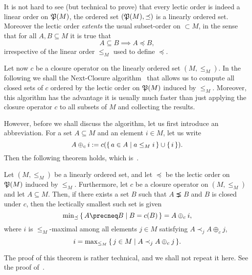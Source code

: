 It is not hard to see (but technical to prove) that every lectic order is indeed a linear
order on ${\mathfrak{P}(M)}$, \ie the ordered set $({\mathfrak{P}(M)}, \preceq)$ is a linearly ordered
set.  Moreover the lectic order \emph{extents} the usual subset-order on $\subset{M}$, in
the sense that for all $A, B \subseteq M$ it is true that
\begin{equation*}
  A \subseteq B \implies A \preceq B,
\end{equation*}
irrespective of the linear order $\leq_M$ used to define $\preceq$.

Let now $c$ be a closure operator on the linearly ordered set $(M, \leq_M)$.  In the
following we shall the Next-Closure algorithm~\cite{fca-book,DBLP:conf/icfca/Ganter10}
that allows us to compute all closed sets of $c$ ordered by the lectic order on
${\mathfrak{P}(M)}$ induced by $\leq_M$.  Moreover, this algorithm has the advantage it is
usually much faster than just applying the closure operator $c$ to all subsets of $M$ and
collecting the results.

However, before we shall discuss the algorithm, let us first introduce an abbreviation.
For a set $A \subseteq M$ and an element $i \in M$, let us write
\begin{equation*}
  A \oplus_c i := c({\{\, a \in A \mid a \leq_M i \,\}} \cup {\ensuremath{\{\,i\,\}}}).
\end{equation*}
Then the following theorem holds, which is~\cite[Theorem 5]{fca-book}.

\begin{Theorem}
  \label{thm:next-closure}
  Let $(M, \leq_M)$ be a linearly ordered set, and let $\preceq$ be the lectic order on
  ${\mathfrak{P}(M)}$ induced by $\leq_M$.  Furthermore, let $c$ be a closure operator on $(M,
  \leq_M)$ and let $A \subseteq M$.  Then, if there exists a set $B$ such that $A \precneq
  B$ and $B$ is closed under $c$, then the lectically smallest such set is given
  \begin{equation*}
    \min\nolimits_{\preceq}\set{ A \precneq B \mid B = c(B) } = A \oplus_c i,
  \end{equation*}
  where $i$ is $\leq_M$-maximal among all elements $j \in M$ satisfying $A \prec_j A
  \oplus_c j$, \ie
  \begin{equation*}
    i = \max\nolimits_{\leq_M} {\{\, j \in M \mid A \prec_j A \oplus_c j \,\}}.
  \end{equation*}
\end{Theorem}

The proof of this theorem is rather technical, and we shall not repeat it here.  See the
proof of~\cite[Theorem 5]{fca-book}.

